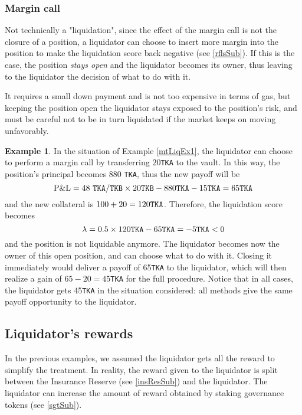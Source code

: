 \documentclass[a4paper,10 pt]{article}
\theoremstyle{definition}
\newtheorem{example}{Example}
\begin{document}
\subsubsection{Margin call}\label{mcSubSub}
Not technically a "liquidation", since the effect of the margin call is not the closure of a position, a liquidator can choose to insert more margin into the position to make the liquidation score back negative (see \ref{rflsSub}). If this is the case, the position {\it stays open} and the liquidator becomes its owner, thus leaving to the liquidator the decision of what to do with it.

It requires a small down payment and is not too expensive in terms of gas, but keeping the position open the liquidator stays exposed to the position's risk, and must be careful not to be in turn liquidated if the market keeps on moving unfavorably.

\begin{example}\label{mtLiqEx3}
In the situation of Example \ref{mtLiqEx1}, the liquidator can choose to perform a margin call by transferring $20$\verb|TKA| to the vault. In this way, the position's principal becomes $880$ \verb|TKA|, thus the new payoff will be $$\text{P\&L} =  48\ \verb|TKA|/\verb|TKB| \times 20  \verb|TKB| -  880 \verb|TKA| - 15\verb|TKA|= 65  \verb|TKA| $$
and the new collateral is $100 + 20 = 120 \verb|TKA|$. Therefore, the liquidation score becomes $$\lambda = 0.5\times 120\verb|TKA| - 65\verb|TKA| = -5\verb|TKA| < 0 $$
and the position is not liquidable anymore. The liquidator becomes now the owner of this open position, and can choose what to do with it. Closing it immediately would deliver a payoff of 65\verb|TKA| to the liquidator, which will then realize a gain of $65-20 = 45$\verb|TKA| for the full procedure. Notice that in all cases, the liquidator gets 45\verb|TKA| in the situation considered: all methods give the same payoff opportunity to the liquidator.
\end{example}

\subsection{Liquidator's rewards}\label{liqrewSub}

In the previous examples, we assumed the liquidator gets all the reward to simplify the treatment. In reality, the reward given to the liquidator is split between the Insurance Reserve (see \ref{insResSub}) and the liquidator. The liquidator can increase the amount of reward obtained by staking governance tokens (see \ref{sgtSub}).
\end{document}
